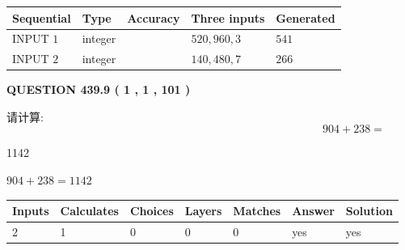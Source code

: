 \documentclass{ctexart}
\begin{document}
   
  
  
\noindent\begin{tabular}{|l|l|l|l|l|}
\hline
 Sequential & Type & Accuracy & Three inputs & Generated \\ 
\hline
 
 
  INPUT $  1 $ & integer &  & $
 520
 , 
 960
 , 
 3
 $ & $ 541 $ 
 \\  \hline  
 
 
  INPUT $  2 $ & integer &  & $
 140
 , 
 480
 , 
 7
 $ & $ 266 $ 
 \\  \hline  
 \end{tabular}
   
   
  
\vspace{0.2in}
  
{\textbf{\Large{QUESTION
439.9 
 ( 1 , 1 , 101 )
}}}
  
  
 
请计算:
\begin{equation}
904 +  %
238 = \nonumber
\end{equation}
 
 
 
\noindent{}
 
 

1142
 
 
\noindent{}
 
 

 
 
 
\noindent{}
 
 

$ %
904 +  %
238=   %
1142$
 
 
\noindent{}
 
 

 
   
   
   
   
\noindent\begin{tabular}{|l|l|l|l|l|l|l|}
 \hline
Inputs & Calculates & Choices & Layers & Matches & Answer & Solution \\ \hline
 2  & 
 1  & 
 0
  & 
 0  & 
 0  & 
  yes & 
  yes 
  \\ \hline
 \end{tabular}
   
\end{document}
